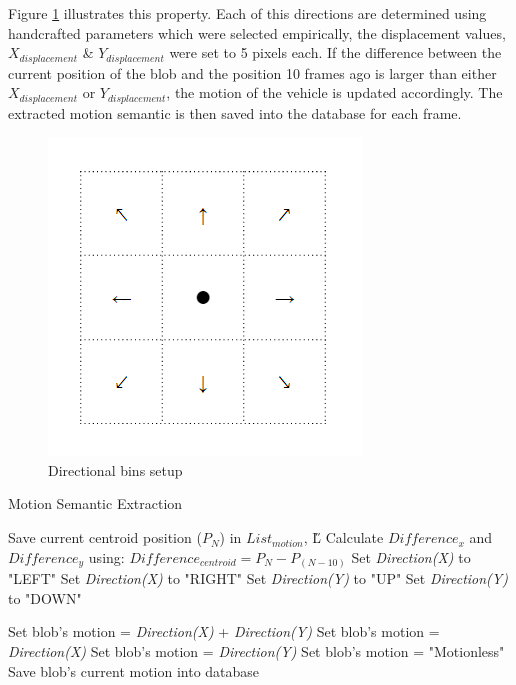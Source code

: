Figure \ref{fig:cardinalbins} illustrates this property. Each of this directions are determined using handcrafted parameters which were selected empirically, the displacement values, $X_{displacement}$ \& $Y_{displacement}$ were set to 5 pixels each. If the difference between the current position of the blob and the position 10 frames ago is larger than either $X_{displacement}$ or $Y_{displacement}$, the motion of the vehicle is updated accordingly. The extracted motion semantic is then saved into the database for each frame.

\begin{figure}[H]\centering
\includegraphics[width=.5\textwidth]{image/new/motion.PNG}
\caption{Directional bins setup}
\label{fig:cardinalbins}
\end{figure}


 \begin{algorithm}[H]
	\caption{Motion Semantic Extraction}
	\label{algo:motion}
	\begin{algorithmic}[1]
		\STATE Save current centroid position ($P_N$) in $List_{motion}$, \H{L}
		\STATE Calculate $Difference_x$ and $Difference_y$ using:
		\STATE $Difference_{centroid} = P_N -P_{(N-10)}$
		\STATE Set \textit{Direction(X)} to "LEFT"
		\ELSE
		\STATE Set \textit{Direction(X)} to "RIGHT"
		\ENDIF
		\ENDIF
		\STATE Set \textit{Direction(Y)} to "UP"
		\ELSE
		\STATE Set \textit{Direction(Y)} to "DOWN"
		\ENDIF
		\ENDIF

		\STATE Set blob's motion = \textit{Direction(X)} + \textit{Direction(Y)}
		\ELSE
		\STATE Set blob's motion = \textit{Direction(X) }
		\STATE Set blob's motion = \textit{Direction(Y)}
		\ELSE
		\STATE Set blob's motion = "Motionless"
		\ENDIF
		\ENDIF
		\ENDIF
		\STATE Save blob's current motion into database
		\ENDFOR
	\end{algorithmic}
\end{algorithm}




